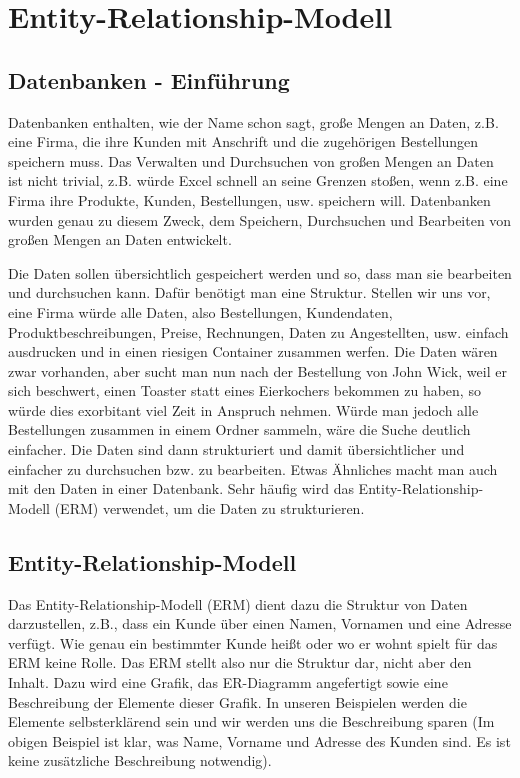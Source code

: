 \section[Entity-Relationship-Modell]{Entity-Relationship-Modell}
\subsection[Datenbanken]{Datenbanken - Einführung}
Datenbanken enthalten, wie der Name schon sagt, große Mengen an Daten, z.B. eine Firma, die ihre Kunden mit Anschrift und die zugehörigen Bestellungen speichern muss. Das Verwalten und Durchsuchen von großen Mengen an Daten ist nicht trivial, z.B. würde Excel schnell an seine Grenzen stoßen, wenn z.B. eine Firma ihre Produkte, Kunden, Bestellungen, usw. speichern will. Datenbanken wurden genau zu diesem Zweck, dem Speichern, Durchsuchen und Bearbeiten von großen Mengen an Daten entwickelt.

Die Daten sollen übersichtlich gespeichert werden und so, dass man sie bearbeiten und durchsuchen kann. Dafür benötigt man eine Struktur. Stellen wir uns vor, eine Firma würde alle Daten, also Bestellungen, Kundendaten, Produktbeschreibungen, Preise, Rechnungen, Daten zu Angestellten, usw. einfach ausdrucken und in einen riesigen Container zusammen werfen. Die Daten wären zwar vorhanden, aber sucht man nun nach der Bestellung von John Wick, weil er sich beschwert, einen Toaster statt eines Eierkochers bekommen zu haben, so würde dies exorbitant viel Zeit in Anspruch nehmen. Würde man jedoch alle Bestellungen zusammen in einem Ordner sammeln, wäre die Suche deutlich einfacher. Die Daten sind dann strukturiert und damit übersichtlicher und einfacher zu durchsuchen bzw. zu bearbeiten. Etwas Ähnliches macht man auch mit den Daten in einer Datenbank. Sehr häufig wird das Entity-Relationship-Modell (ERM) verwendet, um die Daten zu strukturieren.
\subsection[Grundlagen]{Entity-Relationship-Modell}
Das Entity-Relationship-Modell (ERM) dient dazu die Struktur von Daten darzustellen, z.B., dass ein Kunde über einen Namen, Vornamen und eine Adresse verfügt. Wie genau ein bestimmter Kunde heißt oder wo er wohnt spielt für das ERM keine Rolle. Das ERM stellt also nur die Struktur dar, nicht aber den Inhalt. Dazu wird eine Grafik, das ER-Diagramm angefertigt sowie eine Beschreibung der Elemente dieser Grafik. In unseren Beispielen werden die Elemente selbsterklärend sein und wir werden uns die Beschreibung sparen (Im obigen Beispiel ist klar, was Name, Vorname und Adresse des Kunden sind. Es ist keine zusätzliche Beschreibung notwendig).

